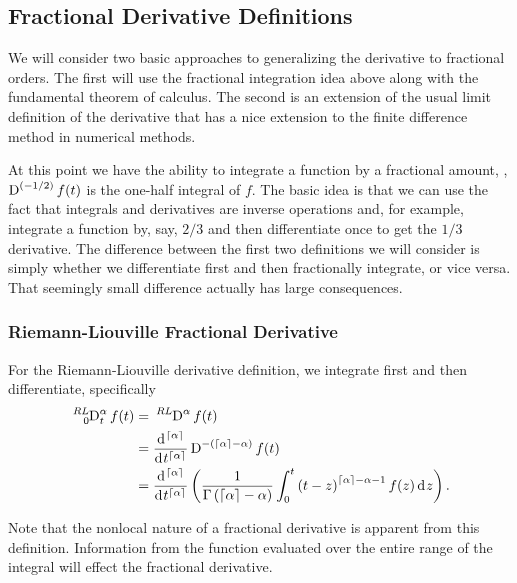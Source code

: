     \subsection{Fractional Derivative Definitions}

    We will consider two basic approaches to generalizing the derivative to fractional orders. The first will use the fractional integration idea above along with the fundamental theorem of calculus. The second is an extension of the usual limit definition of the derivative that has a nice extension to the finite difference method in numerical methods.

    At this point we have the ability to integrate a function by a fractional amount, \eg, $\tensor*{\D}{^{\left( -1/2 \right)}}f(t)$ is the one-half integral of $f$. The basic idea is that we can use the fact that integrals and derivatives are inverse operations and, for example, integrate a function by, say, $2/3$ and then differentiate once to get the $1/3$ derivative. The difference between the first two definitions we will consider is simply whether we differentiate first and then fractionally integrate, or vice versa. That seemingly small difference actually has large consequences.

    \subsubsection{Riemann-Liouville Fractional Derivative}

    For the Riemann-Liouville derivative definition, we integrate first and then differentiate, specifically 
    \begin{equation}
      \begin{aligned}
	\tensor*[^{RL}_0]{\D}{^\alpha_t}  f(t) &= \tensor*[^{RL}]{\D}{^\alpha} f(t) \\
	&= \frac{\d^{\lc \alpha \rc}}{\d t^{\lc \alpha \rc}} \tensor*[]{\D}{^{-\left( \lc \alpha \rc - \alpha \right)}} f(t) \\ 
	&= 
	\frac{\d^{\lc \alpha \rc}}{\d t^{\lc \alpha \rc}} \left( \frac{1}{\Gamma\left(\lc \alpha \rc - \alpha \right)}
	\int_0^t \left( t - z \right)^{\lc \alpha \rc - \alpha - 1} f(z) \d z \right). 
      \end{aligned}
      \label{eq:rldef}
    \end{equation}

    \begin{remark}
      Note that the nonlocal nature of a fractional derivative is apparent from this definition. Information from the function evaluated over the entire range of the integral will effect the fractional derivative. 
      \label{rem:nonlocal}
    \end{remark}

